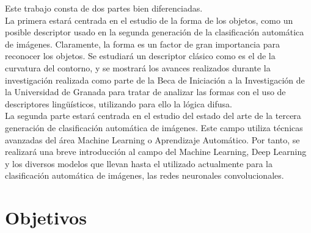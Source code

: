 Este trabajo consta de dos partes bien diferenciadas.\\

La primera estará centrada en el estudio de la forma de los objetos, como un posible descriptor usado en la segunda generación de la clasificación automática de imágenes. Claramente, la forma es un factor de gran importancia para reconocer los objetos. Se estudiará un descriptor clásico como es el de la curvatura del contorno, y se mostrará los avances realizados durante la investigación realizada como parte de la Beca de Iniciación a la Investigación de la Universidad de Granada para tratar de analizar las formas con el uso de descriptores lingüísticos, utilizando para ello la lógica difusa.\\

La segunda parte estará centrada en el estudio del estado del arte de la tercera generación de clasificación automática de imágenes. Este campo utiliza técnicas avanzadas del área Machine Learning o Aprendizaje Automático. Por tanto, se realizará una breve introducción al campo del Machine Learning, Deep Learning y los diversos modelos que llevan hasta el utilizado actualmente para la clasificación automática de imágenes, las redes neuronales convolucionales.\\

\section{Objetivos}

